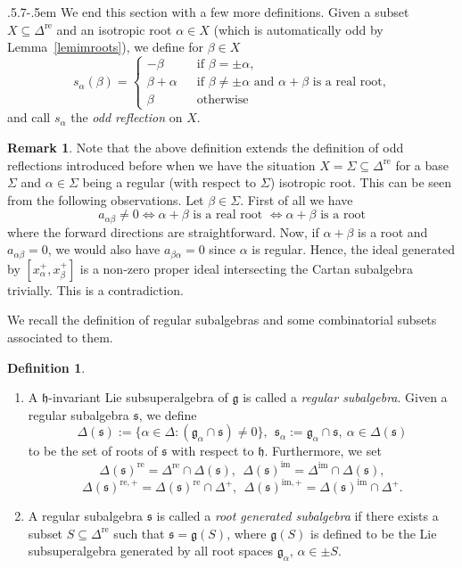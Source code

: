 \documentclass[11pt,reqno]{amsart}
\makeatletter
\theoremstyle{plain}
\theoremstyle{definition}
\newtheorem*{definition}{Definition}
\newtheorem*{rem}{Remark}
\theoremstyle{remark}
\newcommand{\lie}[1]{\mathfrak{#1}}
\numberwithin{equation}{section}
\def\subsection{\def\@secnumfont{\bfseries}\@startsection{subsection}{2}%
  {\parindent}{.5\linespacing\@plus.7\linespacing}{-.5em}%
  {\normalfont\bfseries}}
\makeatother
\begin{document}
\subsection{}\label{secbasicdef}
We end this section with a few more definitions. Given a subset $X\subseteq \Delta^{\mathrm{re}}$ and an isotropic root $\alpha\in X$ (which is automatically odd by Lemma~\ref{lemimroots}), we define for $\beta\in X$
\begin{equation}\label{defoddref}s_\alpha(\beta)=\begin{cases}
    -\beta &\ \ \text{ if }\beta=\pm\alpha,\\
    \beta+\alpha &\ \ \text{ if } \beta\neq \pm\alpha \text{ and } \alpha+\beta \text{ is a real root,}\\
    \beta &\ \ \text{ otherwise }
\end{cases}\end{equation}
and call $s_{\alpha}$ the \textit{odd reflection} on $X$.
\begin{rem}
    Note that the above definition extends the definition of odd reflections introduced before when we have the situation $X=\Sigma\subseteq \Delta^{\mathrm{re}}$ for a base $\Sigma$ and $\alpha\in\Sigma$ being a regular (with respect to $\Sigma$) isotropic root.  This can be seen from the following  observations. Let $\beta\in \Sigma$. First of all we have 
    $$a_{\alpha\beta}\neq 0 \iff \alpha+\beta \text{ is a real root }\iff \alpha+\beta \text{ is a root}$$
    where the forward directions are straightforward. Now, if $\alpha+\beta$ is a root and $a_{\alpha\beta}=0$, we would also have  $a_{\beta\alpha}=0$ since $\alpha$ is regular. Hence, the ideal generated by $[x^+_\alpha,x^+_\beta]$ is a non-zero proper ideal intersecting the Cartan subalgebra trivially. This is a contradiction.
\end{rem}
We recall the definition of regular subalgebras and some combinatorial subsets associated to them.
\begin{definition}\begin{enumerate}
    \item  A $\lie h$-invariant Lie subsuperalgebra of $\lie{g}$ is called a \textit{regular subalgebra}. Given a regular subalgebra $\lie{s}$, we define
$$\Delta(\lie{s}):=\{\alpha\in\Delta:(\lie{g}_{\alpha}\cap \lie s)\neq 0\},\ \ \lie{s}_{\alpha}:=\lie{g}_\alpha\cap \lie{s},\ \alpha\in\Delta(\lie s)$$ to be the set of roots of $\lie s$ with respect to $\lie h$. Furthermore, we set 
$$\Delta(\lie{s})^{\mathrm{re}}=\Delta^{\mathrm{re}}\cap \Delta(\lie{s}),\ \ \Delta(\lie{s})^{\mathrm{im}}=\Delta^{\mathrm{im}}\cap \Delta(\lie{s}),$$ 
$$\Delta(\lie{s})^{\mathrm{re},+}=\Delta(\lie{s})^{\mathrm{re}}\cap \Delta^+,\ \ \Delta(\lie{s})^{\mathrm{im},+}=\Delta(\lie{s})^{\mathrm{im}}\cap \Delta^+.$$
\item A regular subalgebra $\lie s$ is called a \textit{root generated subalgebra} if there exists a subset $S\subseteq \Delta^{\mathrm{re}}$ such that $\lie s=\lie g(S)$, where $\lie g(S)$ is defined to be the Lie subsuperalgebra generated by all root spaces $\lie g_{\alpha}$, $\alpha\in \pm S$.
\end{enumerate}
\end{definition} 
\end{document}
